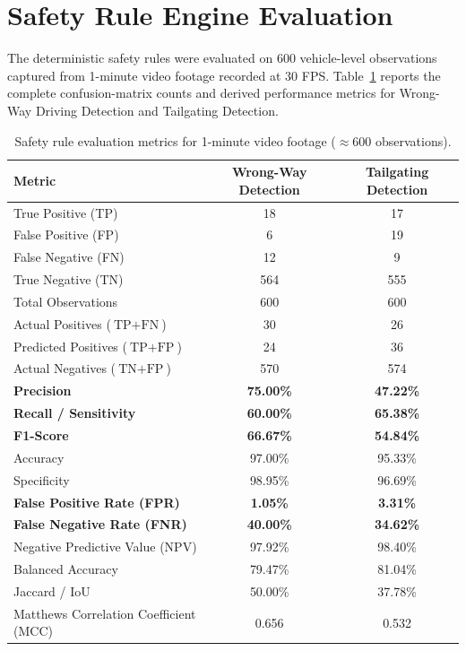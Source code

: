 \documentclass[12pt,a4paper]{report}
\begin{document}
\section{Safety Rule Engine Evaluation}

The deterministic safety rules were evaluated on 600 vehicle-level observations captured from 1-minute video footage recorded at 30 FPS. Table~\ref{tab:safety_rule_full_eval} reports the complete confusion-matrix counts and derived performance metrics for Wrong-Way Driving Detection and Tailgating Detection.

\begin{table}[H]
\centering
\caption{Safety rule evaluation metrics for 1-minute video footage ($\approx 600$ observations).}
\label{tab:safety_rule_full_eval}
\begin{tabular}{lcc}
\toprule
\textbf{Metric} & \textbf{Wrong-Way Detection} & \textbf{Tailgating Detection} \\
\midrule
True Positive (TP) & 18 & 17 \\
False Positive (FP) & 6 & 19 \\
False Negative (FN) & 12 & 9 \\
True Negative (TN) & 564 & 555 \\
\midrule
Total Observations & 600 & 600 \\
Actual Positives ($\text{TP}+\text{FN}$) & 30 & 26 \\
Predicted Positives ($\text{TP}+\text{FP}$) & 24 & 36 \\
Actual Negatives ($\text{TN}+\text{FP}$) & 570 & 574 \\
\midrule
\textbf{Precision} & \textbf{75.00\%} & \textbf{47.22\%} \\
\textbf{Recall / Sensitivity} & \textbf{60.00\%} & \textbf{65.38\%} \\
\textbf{F1-Score} & \textbf{66.67\%} & \textbf{54.84\%} \\
Accuracy & 97.00\% & 95.33\% \\
Specificity & 98.95\% & 96.69\% \\
\textbf{False Positive Rate (FPR)} & \textbf{1.05\%} & \textbf{3.31\%} \\
\textbf{False Negative Rate (FNR)} & \textbf{40.00\%} & \textbf{34.62\%} \\
Negative Predictive Value (NPV) & 97.92\% & 98.40\% \\
Balanced Accuracy & 79.47\% & 81.04\% \\
Jaccard / IoU & 50.00\% & 37.78\% \\
Matthews Correlation Coefficient (MCC) & 0.656 & 0.532 \\
\bottomrule
\end{tabular}
\end{table}
\end{document}
